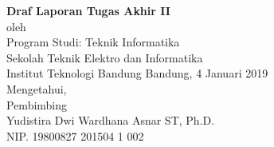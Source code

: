 \begin{center}
	\large
	\textbf{\MakeUppercase{\thetitle}}
	\small
\end{center}

\begin{center}
	
	\vfill
	\textbf{Draf Laporan Tugas Akhir II}\\
	\vfill
	oleh\\
	\theauthor
	\vfill
	Program Studi: Teknik Informatika \\
	Sekolah Teknik Elektro dan Informatika \\
	Institut Teknologi Bandung
	\vfill
	Bandung, 4 Januari 2019 \\
	Mengetahui,\\
	Pembimbing \\
	\vspace{60pt}
	Yudistira Dwi Wardhana Asnar ST, Ph.D.\\
	NIP. 19800827 201504 1 002
\end{center}